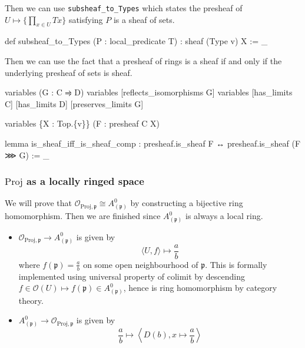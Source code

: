 \documentclass[11pt]{article}
\newenvironment{Shaded}{}{}
\newcommand{\NormalTok}[1]{{#1}}
\begin{document}
    Then we can use \texttt{subsheaf\_to\_Types} which states the presheaf
of \(U\mapsto \{\prod_{x\in U} T x\}\) satisfying \(P\) is a sheaf of
sets.

\begin{Shaded}
\begin{Highlighting}[]
\NormalTok{def subsheaf\_to\_Types (P : local\_predicate T) : sheaf (Type v) X := \_}
\end{Highlighting}
\end{Shaded}

    Then we can use the fact that a presheaf of rings is a sheaf if and only
if the underlying presheaf of sets is sheaf.

\begin{Shaded}
\begin{Highlighting}[]
\NormalTok{variables (G : C ⥤ D)}
\NormalTok{variables [reflects\_isomorphisms G]}
\NormalTok{variables [has\_limits C] [has\_limits D] [preserves\_limits G]}

\NormalTok{variables \{X : Top.\{v\}\} (F : presheaf C X)}

\NormalTok{lemma is\_sheaf\_iff\_is\_sheaf\_comp :}
\NormalTok{  presheaf.is\_sheaf F ↔ presheaf.is\_sheaf (F ⋙ G) := \_}
\end{Highlighting}
\end{Shaded}

    \hypertarget{mathrmproj-as-a-locally-ringed-space}{%
\subsubsection{\texorpdfstring{\(\mathrm{Proj}\) as a locally ringed
space}{\textbackslash mathrm\{Proj\} as a locally ringed space}}\label{mathrmproj-as-a-locally-ringed-space}}

    We will prove that
\(\mathcal{O}_{\mathrm{Proj}, \mathfrak p}\cong A^0_{(\mathfrak p)}\) by
constructing a bijective ring homomorphism. Then we are finished since
\(A^0_{(\mathfrak p)}\) is always a local ring.

    \begin{itemize}
\item
  \(\mathcal{O}_{\mathrm{Proj}, \mathfrak p}\to A^0_{(\mathfrak p)}\) is
  given by \[
  \langle U, f\rangle\mapsto \frac a b
  \] where \(f(\mathfrak p)=\frac a b\) on some open neighbourhood of
  \(\mathfrak p\). This is formally implemented using universal property
  of colimit by descending
  \(f\in\mathcal{O}(U)\mapsto f(\mathfrak p)\in A^0_{(\mathfrak p)}\),
  hence is ring homomorphism by category theory.
\item
  \(A^0_{(\mathfrak p)}\to \mathcal{O}_{\mathrm{Proj}, \mathfrak p}\) is
  given by \[
  \frac a b \mapsto \left\langle D(b), x\mapsto \frac a b \right\rangle
  \]
\end{itemize}
\end{document}
